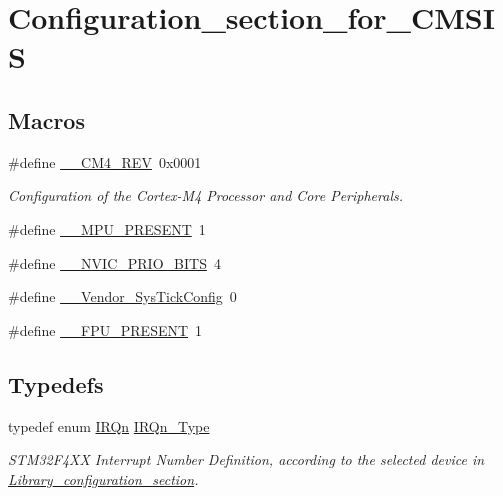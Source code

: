 \hypertarget{group___configuration__section__for___c_m_s_i_s}{}\section{Configuration\+\_\+section\+\_\+for\+\_\+\+C\+M\+S\+IS}
\label{group___configuration__section__for___c_m_s_i_s}
\subsection*{Macros}
\begin{DoxyCompactItemize}
\item 
\#define \hyperlink{group___configuration__section__for___c_m_s_i_s_ga45a97e4bb8b6ce7c334acc5f45ace3ba}{\+\_\+\+\_\+\+C\+M4\+\_\+\+R\+EV}~0x0001
\begin{DoxyCompactList}\small\item\em Configuration of the Cortex-\/\+M4 Processor and Core Peripherals. \end{DoxyCompactList}\item 
\#define \hyperlink{group___configuration__section__for___c_m_s_i_s_ga4127d1b31aaf336fab3d7329d117f448}{\+\_\+\+\_\+\+M\+P\+U\+\_\+\+P\+R\+E\+S\+E\+NT}~1
\item 
\#define \hyperlink{group___configuration__section__for___c_m_s_i_s_gae3fe3587d5100c787e02102ce3944460}{\+\_\+\+\_\+\+N\+V\+I\+C\+\_\+\+P\+R\+I\+O\+\_\+\+B\+I\+TS}~4
\item 
\#define \hyperlink{group___configuration__section__for___c_m_s_i_s_gab58771b4ec03f9bdddc84770f7c95c68}{\+\_\+\+\_\+\+Vendor\+\_\+\+Sys\+Tick\+Config}~0
\item 
\#define \hyperlink{group___configuration__section__for___c_m_s_i_s_gac1ba8a48ca926bddc88be9bfd7d42641}{\+\_\+\+\_\+\+F\+P\+U\+\_\+\+P\+R\+E\+S\+E\+NT}~1
\end{DoxyCompactItemize}
\subsection*{Typedefs}
\begin{DoxyCompactItemize}
\item 
typedef enum \hyperlink{group___configuration__section__for___c_m_s_i_s_ga666eb0caeb12ec0e281415592ae89083}{I\+R\+Qn} \hyperlink{group___configuration__section__for___c_m_s_i_s_gac3af4a32370fb28c4ade8bf2add80251}{I\+R\+Qn\+\_\+\+Type}\hypertarget{group___configuration__section__for___c_m_s_i_s_gac3af4a32370fb28c4ade8bf2add80251}{}\label{group___configuration__section__for___c_m_s_i_s_gac3af4a32370fb28c4ade8bf2add80251}

\begin{DoxyCompactList}\small\item\em S\+T\+M32\+F4\+XX Interrupt Number Definition, according to the selected device in \hyperlink{group___library__configuration__section}{Library\+\_\+configuration\+\_\+section}. \end{DoxyCompactList}\end{DoxyCompactItemize}
